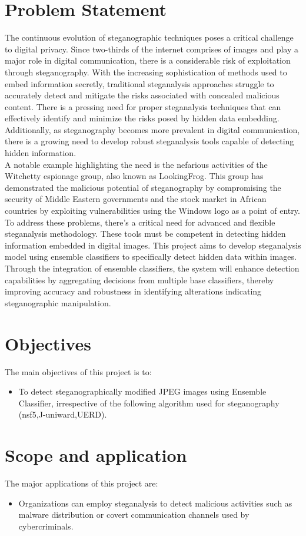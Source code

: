 \section{Problem Statement} 
The continuous evolution of steganographic techniques poses a critical challenge to digital privacy. Since two-thirds of the internet comprises of images and play a major role in digital communication, there is a considerable risk of exploitation through steganography. With the increasing sophistication of methods used to embed information secretly, traditional steganalysis approaches struggle to accurately detect and mitigate the risks associated with concealed malicious content. There is a pressing need for proper steganalysis techniques that can effectively identify and minimize the risks posed by hidden data embedding. Additionally, as steganography becomes more prevalent in digital communication, there is a growing need to develop robust steganalysis tools capable of detecting hidden information.\\
A notable example highlighting the need is the nefarious activities of the Witchetty espionage group, also known as LookingFrog. This group has demonstrated the malicious potential of steganography by compromising the security of Middle Eastern governments and the stock market in African countries by exploiting vulnerabilities using the Windows logo as a point of entry.\\
To address these problems, there’s a critical need for advanced and flexible steganalysis methodology. These tools must be competent in detecting hidden information embedded in digital images. This project aims to develop steganalysis model using ensemble classifiers to specifically detect hidden data within images. Through the integration of ensemble classifiers, the system will enhance detection capabilities by aggregating decisions from multiple base classifiers, thereby improving accuracy and robustness in identifying alterations indicating steganographic manipulation.\\
\section{Objectives}
The main objectives of this project is to:
\begin{itemize}
\item  To detect steganographically modified JPEG images using Ensemble \mbox{Classifier}, irrespective of the following algorithm used for steganography (nsf5,J-uniward,UERD). 
\end{itemize}
\section{Scope and application}
The major applications of this project are:
\begin{itemize}
    \item Organizations can employ steganalysis to detect malicious activities such as malware distribution or covert communication channels used by cybercriminals.
\end{itemize}

